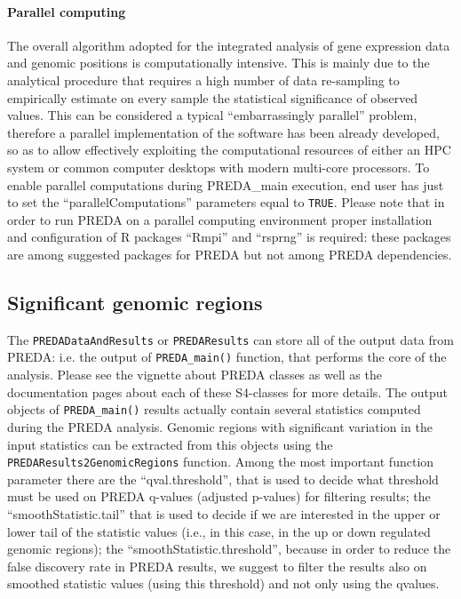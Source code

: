 \documentclass[a4paper,10pt]{article}
\begin{document}
\paragraph{Parallel computing}
The overall algorithm adopted for the integrated analysis of gene expression data and genomic positions is computationally intensive. This is mainly due to the analytical procedure that requires a high number of data re-sampling to empirically estimate on every sample the statistical significance of observed values. This can be considered a typical ``embarrassingly parallel'' problem, therefore a parallel implementation of the software has been already developed, so as to allow effectively exploiting the computational resources of either an HPC system or common computer desktops with modern multi-core processors.
To enable parallel computations during PREDA\_main execution, end user has just to set the ``parallelComputations'' parameters equal to \texttt{TRUE}. Please note that in order to run PREDA on a parallel computing environment proper installation and configuration of R packages ``Rmpi'' and ``rsprng'' is required: these packages are among suggested packages for PREDA but not among PREDA dependencies.



\subsection{Significant genomic regions}
The \texttt{PREDADataAndResults} or \texttt{PREDAResults} can store all of the output data from PREDA: i.e. the output of \texttt{PREDA\_main()} function, that performs the core of the analysis. Please see the vignette about PREDA classes as well as the documentation pages about each of these S4-classes for more details. The output objects of \texttt{PREDA\_main()} results actually contain several statistics computed during the PREDA analysis. Genomic regions with significant variation in the input statistics can be extracted from this objects using the \texttt{PREDAResults2GenomicRegions} function. Among the most important function parameter there are the ``qval.threshold'', that is used to decide what threshold must be used on PREDA q-values (adjusted p-values) for filtering results; the ``smoothStatistic.tail'' that is used to decide if we are interested in the upper or lower tail of the statistic values (i.e., in this case, in the up or down regulated genomic regions); the ``smoothStatistic.threshold'', because in order to reduce the false discovery rate in PREDA results, we suggest to filter the results also on smoothed statistic values (using this threshold) and not only using the qvalues.
\end{document}
